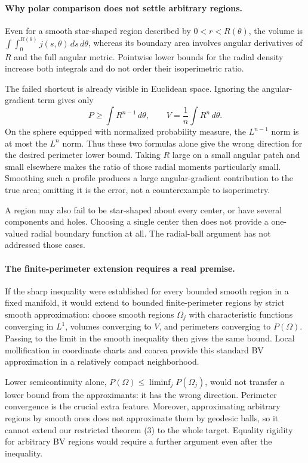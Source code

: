 \documentclass[11pt]{article}
\begin{document}
\paragraph{Why polar comparison does not settle arbitrary regions.}
Even for a smooth star-shaped region described by $0<r<R(\theta)$,
the volume is $\int\int_0^{R(\theta)}j(s,\theta)\,ds\,d\theta$,
whereas its boundary area involves angular derivatives of $R$ and
the full angular metric. Pointwise lower bounds for the radial density
increase both integrals and do not order their isoperimetric ratio.

The failed shortcut is already visible in Euclidean space. Ignoring
the angular-gradient term gives only
\[
 P\ge\int R^{n-1}\,d\theta,\qquad
 V=\frac1n\int R^n\,d\theta.
\]
On the sphere equipped with normalized probability measure, the
$L^{n-1}$ norm is at most the $L^n$ norm. Thus these two formulas alone
give the wrong direction for the desired perimeter lower bound.
Taking $R$ large on a small angular patch and small elsewhere makes
the ratio of those radial moments particularly small. Smoothing such
a profile produces a large angular-gradient contribution to the true
area; omitting it is the error, not a counterexample to isoperimetry.

A region may also fail to be star-shaped about every center, or have
several components and holes. Choosing a single center then does not
provide a one-valued radial boundary function at all. The radial-ball
argument has not addressed those cases.

\paragraph{The finite-perimeter extension requires a real premise.}
If the sharp inequality were established for every bounded smooth
region in a fixed manifold, it would extend to bounded finite-perimeter
regions by strict smooth approximation: choose smooth regions
$\Omega_j$ with characteristic functions converging in $L^1$,
volumes converging to $V$, and perimeters converging to $P(\Omega)$.
Passing to the limit in the smooth inequality then gives the same bound.
Local mollification in coordinate charts and coarea provide this
standard BV approximation in a relatively compact neighborhood.

Lower semicontinuity alone, $P(\Omega)\le\liminf_jP(\Omega_j)$,
would not transfer a lower bound from the approximants: it has the
wrong direction. Perimeter convergence is the crucial extra feature.
Moreover, approximating arbitrary regions by smooth ones does not
approximate them by geodesic balls, so it cannot extend our restricted
theorem (3) to the whole target. Equality rigidity for arbitrary BV
regions would require a further argument even after the inequality.
\end{document}

